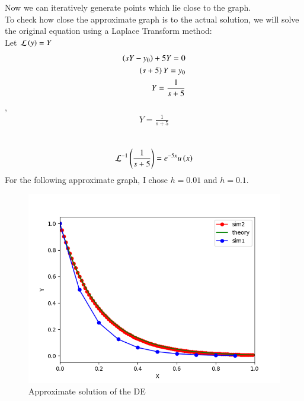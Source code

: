 \documentclass[journal]{IEEEtran}
\begin{document}
Now we can iteratively generate points which lie close to the graph.\\
To check how close the approximate graph is to the actual solution, we will solve the original 
equation using a Laplace Transform method:\\
Let $\mathcal{L}\left(y\right) = Y$\\
\begin{align}
    \left(sY - y_0\right) +5Y = 0\\
    \left(s + 5\right)Y = y_0\\
    Y = \frac{1}{s + 5}\\
\end{align}
    ,\\
\begin{align}
    Y = \frac{1}{s + 5}\\
\end{align}
    \\
\begin{align}
    \mathcal{L}^{-1}\left(\frac{1}{s+5}\right) = e^{-5x}u\left(x\right)
\end{align}
For the following approximate graph, I chose $h = 0.01$ and $h = 0.1$.
\begin{figure}[h!]
   \centering
   \includegraphics[width=0.7\columnwidth]{figs/fig.png}
    \caption{Approximate solution of the DE}
\end{figure}
\end{document}
